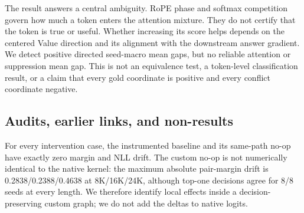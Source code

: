 \begin{table}[t]
  \centering
  \scriptsize
  \setlength{\tabcolsep}{4.5pt}
  \caption{Gold-minus-conflict class gaps over baseline sampled coordinates
  after within-seed aggregation.  Intervals are seed-cluster 95\% CIs.  The
  directed mean gaps exclude zero; amount and suppression mean-gap intervals
  include zero.}
  \label{tab:gold-conflict}
\end{table}

The result answers a central ambiguity.  RoPE phase and softmax competition
govern how much a token enters the attention mixture.  They do not certify that
the token is true or useful.  Whether increasing its score helps depends on the
centered Value direction and its alignment with the downstream answer gradient.
We detect positive directed seed-macro mean gaps, but no reliable attention or
suppression mean gap.  This is not an equivalence test, a token-level
classification result, or a claim that every gold coordinate is positive and
every conflict coordinate negative.

\subsection{Audits, earlier links, and non-results}

For every intervention case, the instrumented baseline and its same-path no-op
have exactly zero margin and NLL drift.  The custom no-op is not numerically
identical to the native kernel: the maximum absolute pair-margin drift is
0.2838/0.2388/0.4638 at 8K/16K/24K, although top-one decisions agree for 8/8
seeds at every length.  We therefore identify local effects inside a
decision-preserving custom graph; we do not add the deltas to native logits.

